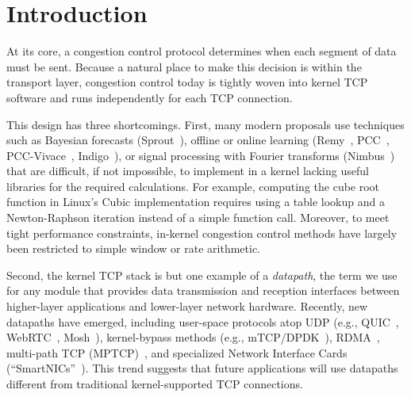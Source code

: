 \section{Introduction}

At its core, a congestion control protocol determines when each segment of data must be sent. Because a natural place to make this decision is within the transport layer, congestion control today is tightly woven into kernel TCP software and runs independently for each TCP connection.

This design has three shortcomings. First, many modern proposals use techniques such as Bayesian forecasts (Sprout~\cite{sprout}), offline or online learning (Remy~\cite{remy}, PCC~\cite{pcc}, PCC-Vivace~\cite{pcc-vivace}, Indigo~\cite{pantheon}), or signal processing with Fourier transforms (Nimbus~\cite{nimbus-arxiv}) that are difficult, if not impossible, to implement in a kernel lacking useful libraries for the required calculations. For example, computing the cube root function in Linux's Cubic implementation requires using a table lookup and a Newton-Raphson iteration instead of a simple function call. Moreover, to meet tight performance constraints, in-kernel congestion control methods have largely been restricted to simple window or rate arithmetic.

Second, the kernel TCP stack is but one example of a {\em datapath}, the term we use for any module that provides data transmission and reception interfaces between higher-layer applications and lower-layer network hardware. Recently, new datapaths have emerged, including user-space protocols atop UDP (e.g., QUIC~\cite{quic}, WebRTC~\cite{webrtc}, Mosh~\cite{mosh}), kernel-bypass methods (e.g., mTCP/DPDK~\cite{dpdk,mtcp,netmap}), RDMA~\cite{dcqcn}, multi-path TCP (MPTCP)~\cite{mptcp}, and specialized Network Interface Cards (``SmartNICs''~\cite{smartnic}). This trend suggests that future applications will use datapaths different from traditional kernel-supported TCP connections.
%

